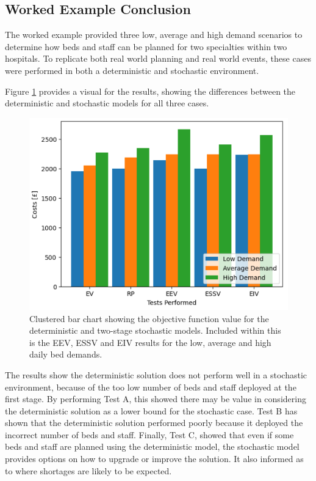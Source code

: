 \documentclass[../thesis.tex]{subfiles}
\begin{document}
\subsection{Worked Example Conclusion}
The worked example provided three low, average and high demand scenarios to determine how beds and staff can be planned for two specialties within two hospitals. To replicate both real world planning and real world events, these cases were performed in both a deterministic and stochastic environment. 

Figure \ref{fig:WETests} provides a visual for the results, showing the differences between the deterministic and stochastic models for all three cases.

\begin{figure}[h!]
    \centering
    \includegraphics{Chapters/Chapter4/Figures/updatestests.png}
    \caption{Clustered bar chart showing the objective function value for the deterministic and two-stage stochastic models. Included within this is the EEV, ESSV and EIV results for the low, average and high daily bed demands.}
    \label{fig:WETests}
\end{figure}

The results show the deterministic solution does not perform well in a stochastic environment, because of the too low number of beds and staff deployed at the first stage. By performing Test A, this showed there may be value in considering the deterministic solution as a lower bound for the stochastic case. Test B has shown that the deterministic solution performed poorly because it deployed the incorrect number of beds and staff. Finally, Test C, showed that even if some beds and staff are planned using the deterministic model, the stochastic model provides options on how to upgrade or improve the solution. It also informed as to where shortages are likely to be expected.
\end{document}
